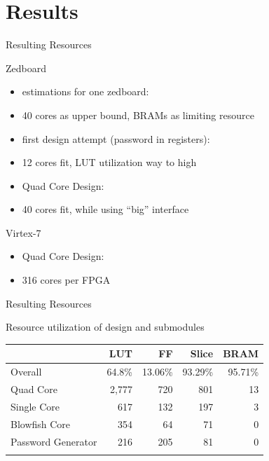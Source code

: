 \section{Results}

\begin{frame}{Resulting Resources}
	\begin{block}{Zedboard}
		\begin{itemize}
			\item estimations for one zedboard:
			\item[] 40 cores as upper bound, BRAMs as limiting resource
			\item first design attempt (password in registers):
			\item[] 12 cores fit, LUT utilization way to high
			\item Quad Core Design:
			\item[] 40 cores fit, while using \enquote{big} interface
		\end{itemize}
	\end{block}
	\begin{block}{Virtex-7}
		\begin{itemize}
			\item Quad Core Design:
			\item[] 316 cores per FPGA
		\end{itemize}
	\end{block}
\end{frame}

\begin{frame}{Resulting Resources}
	\begin{block}{Resource utilization of design and submodules}
		\begin{table}[tp]
			\centering
			\begin{tabular}{l r r r r}
				\toprule
								   &   LUT   &   FF    &  Slice  &  BRAM   \\
				\midrule
				Overall            &  64.8\% & 13.06\% & 93.29\% & 95.71\% \\
				\midrule
				Quad Core          &  2,777  &    720  &    801  &   13    \\
				Single Core        &    617  &    132  &    197  &    3    \\
				Blowfish Core      &    354  &     64  &     71  &    0    \\
				Password Generator &    216  &    205  &     81  &    0    \\
				\bottomrule\\
			\end{tabular}
		\end{table}
	\end{block}
\end{frame}

